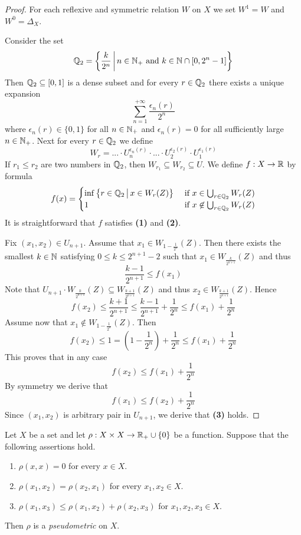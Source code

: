 \documentclass[10pt]{amsart}
\begin{document}
\begin{proof}
	For each reflexive and symmetric relation $W$ on $X$ we set $W^{1} = W$ and $W^0 = \Delta_X$.

	Consider the set
	$${\mathbb Q}_2 = \bigg\{\frac{k}{2^n}\,\bigg|\,n\in {\mathbb N}_+\mbox{ and }k\in {\mathbb N}\cap [0,2^{n} - 1]\bigg\}$$
	Then ${\mathbb Q}_2 \subseteq [0,1]$ is a dense subset and for every $r \in {\mathbb Q}_2$ there exists a unique expansion
	$$\sum_{n=1}^{+\infty}\frac{\epsilon_n(r)}{2^n}$$
	where $\epsilon_n(r) \in \{0,1\}$ for all $n\in {\mathbb N}_+$ and $\epsilon_n(r) = 0$ for all sufficiently large $n \in {\mathbb N}_+$. Next for every $r \in {\mathbb Q}_2$ we define
	$$W_r = ... \cdot U_n^{\epsilon_n(r)}\cdot ...\cdot U_2^{\epsilon_2(r)}\cdot U_1^{\epsilon_1(r)}$$
	If $r_1 \leq r_2$ are two numbers in ${\mathbb Q}_2$, then $W_{r_1}\subseteq W_{r_2} \subseteq U$. We define $f:X\rightarrow {\mathbb R}$ by formula
	$$f(x) = \begin{cases}
			\inf \big\{r\in {\mathbb Q}_2\,\big|\,x\in W_r(Z)\big\} & \mbox{ if }x \in \bigcup_{r\in {\mathbb Q}_2}W_r(Z)      \\
			1                                               & \mbox{ if }x\not \in \bigcup_{r \in {\mathbb Q}_2}W_r(Z) \\
		\end{cases}
	$$
	It is straightforward that $f$ satisfies \textbf{(1)} and \textbf{(2)}.

	Fix $(x_1,x_2) \in U_{n+1}$. Assume that $x_1 \in W_{1 - \frac{1}{2^{n}}}(Z)$. Then there exists the smallest $k \in {\mathbb N}$ satisfying $0 \leq k \leq 2^{n+1} -2$ such that $x_1 \in W_{\frac{k}{2^{n+1}}}(Z)$ and thus
	$$\frac{k - 1}{2^{n+1}} \leq f(x_1)$$
	Note that $U_{n+1}\cdot W_{\frac{k}{2^{n+1}}}(Z) \subseteq W_{\frac{k + 1}{2^{n+1}}}(Z)$ and thus $x_2 \in W_{\frac{k + 1}{2^{n + 1}}}(Z)$. Hence
	$$f(x_2) \leq \frac{k + 1}{2^{n+1}} \leq \frac{k - 1}{2^{n+1}} + \frac{1}{2^{n}}\leq f(x_1) + \frac{1}{2^n}$$
	Assume now that $x_1 \not \in W_{1 - \frac{1}{2^{n}}}(Z)$. Then
	$$f(x_2) \leq 1 = \left(1 - \frac{1}{2^n}\right) + \frac{1}{2^{n}} \leq f(x_1) + \frac{1}{2^n}$$
	This proves that in any case
	$$f(x_2) \leq f(x_1) + \frac{1}{2^n}$$
	By symmetry we derive that
	$$f(x_1) \leq f(x_2) + \frac{1}{2^n}$$
	Since $(x_1, x_2)$ is arbitrary pair in $U_{n + 1}$, we derive that \textbf{(3)} holds.
\end{proof}

\begin{definition}
	Let $X$ be a set and let $\rho:X\times X \rightarrow {\mathbb R}_+\cup \{0\}$ be a function. Suppose that the following assertions hold.
	\begin{enumerate}[label=\textbf{(\arabic*)}, leftmargin=3.0em]
		\item $\rho(x, x) = 0$ for every $x \in X$.
		\item $\rho(x_1, x_2) = \rho(x_2, x_1)$ for every $x_1,x_2 \in X$.
		\item $\rho(x_1, x_3) \leq \rho(x_1, x_2) + \rho(x_2, x_3)$ for $x_1,x_2,x_3 \in X$.
	\end{enumerate}
	Then $\rho$ is a \textit{pseudometric} on $X$.
\end{definition}
\end{document}
